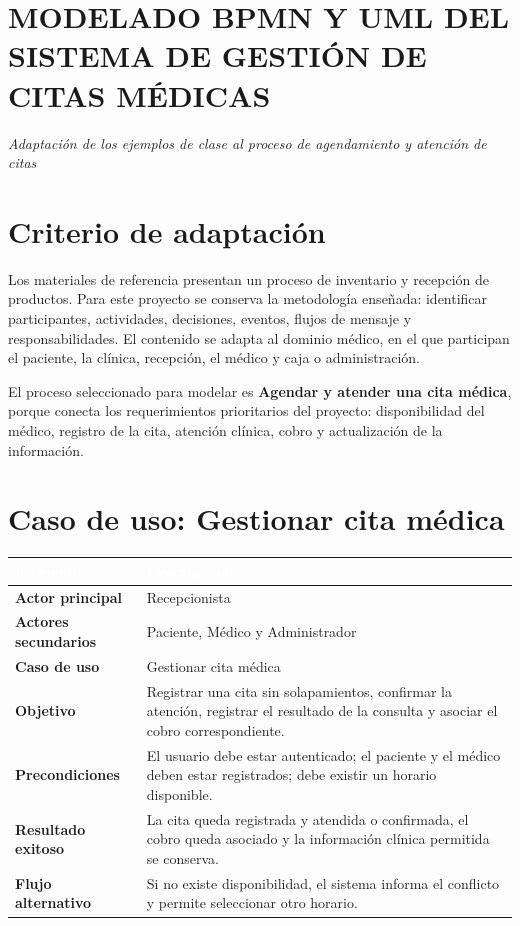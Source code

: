 \section*{MODELADO BPMN Y UML DEL SISTEMA DE GESTIÓN DE CITAS MÉDICAS}
\begin{center}
\textit{Adaptación de los ejemplos de clase al proceso de agendamiento y atención de citas}
\end{center}

\section{Criterio de adaptación}

Los materiales de referencia presentan un proceso de inventario y recepción de productos. Para este proyecto se conserva la metodología enseñada: identificar participantes, actividades, decisiones, eventos, flujos de mensaje y responsabilidades. El contenido se adapta al dominio médico, en el que participan el paciente, la clínica, recepción, el médico y caja o administración.

El proceso seleccionado para modelar es \textbf{Agendar y atender una cita médica}, porque conecta los requerimientos prioritarios del proyecto: disponibilidad del médico, registro de la cita, atención clínica, cobro y actualización de la información.

\section{Caso de uso: Gestionar cita médica}

\begin{tabularx}{\textwidth}{>{\bfseries}p{}X}
\toprule
\rowcolor{azulprincipal}\textcolor{white}{Elemento} & \textcolor{white}{Descripción}\\
\midrule
Actor principal & Recepcionista\\
Actores secundarios & Paciente, Médico y Administrador\\
Caso de uso & Gestionar cita médica\\
Objetivo & Registrar una cita sin solapamientos, confirmar la atención, registrar el resultado de la consulta y asociar el cobro correspondiente.\\
Precondiciones & El usuario debe estar autenticado; el paciente y el médico deben estar registrados; debe existir un horario disponible.\\
Resultado exitoso & La cita queda registrada y atendida o confirmada, el cobro queda asociado y la información clínica permitida se conserva.\\
Flujo alternativo & Si no existe disponibilidad, el sistema informa el conflicto y permite seleccionar otro horario.\\
\bottomrule
\end{tabularx}

